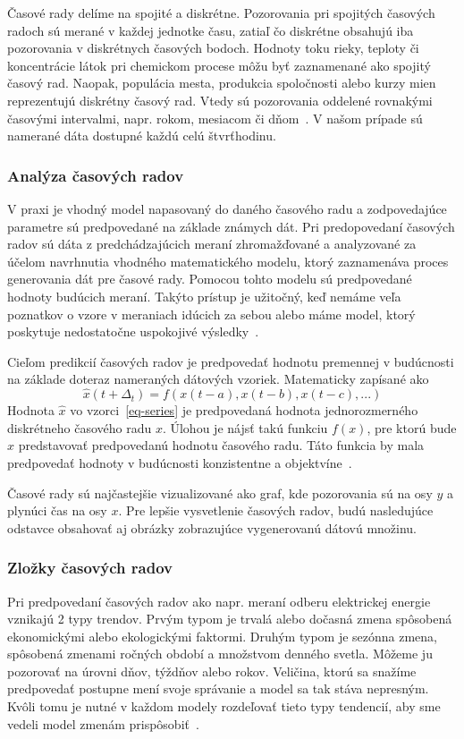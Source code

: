 \documentclass[a4paper,slovak,12pt,appendix]{article}
\begin{document}
Časové rady delíme na spojité a diskrétne. Pozorovania pri spojitých časových
radoch sú merané v každej jednotke času, zatiaľ čo diskrétne obsahujú iba
pozorovania v diskrétnych časových bodoch. Hodnoty toku rieky, teploty
či koncentrácie látok pri chemickom procese môžu byť zaznamenané ako spojitý
časový rad. Naopak, populácia mesta, produkcia spoločnosti alebo kurzy mien
reprezentujú diskrétny časový rad. Vtedy sú pozorovania oddelené rovnakými
časovými intervalmi, napr. rokom, mesiacom či dňom~\cite{Agrawal2013}. V našom
prípade sú namerané dáta dostupné každú celú štvrťhodinu.

\subsubsection{Analýza časových radov}
\label{time-series-analysis}
V praxi je vhodný model napasovaný do daného časového radu a zodpovedajúce
parametre sú predpovedané na základe známych dát. Pri predopovedaní časových
radov sú dáta z predchádzajúcich meraní zhromažďované a analyzované za účelom
navrhnutia vhodného matematického modelu, ktorý zaznamenáva proces generovania
dát pre časové rady. Pomocou tohto modelu sú predpovedané hodnoty budúcich
meraní. Takýto prístup je užitočný, keď nemáme veľa poznatkov o vzore
v meraniach idúcich za sebou alebo máme model, ktorý poskytuje nedostatočne
uspokojivé výsledky~\cite{Agrawal2013}.

Cieľom predikcií časových radov je predpovedať hodnotu premennej v budúcnosti
na základe doteraz nameraných dátových vzoriek. Matematicky zapísané ako
\begin{equation}
  \hat{x}(t+\Delta_t) = f(x(t-a), x(t-b), x(t-c), ...)
  \label{eq-series}
\end{equation}
Hodnota $\hat{x}$ vo vzorci~\ref{eq-series} je predpovedaná hodnota
jednorozmerného diskrétneho časového radu $x$. Úlohou je nájsť takú funkciu
$f(x)$, pre ktorú bude $\hat{x}$ predstavovať predpovedanú hodnotu časového
radu. Táto funkcia by mala predpovedať hodnoty v budúcnosti konzistentne
a objektvíne~\cite{Sapankevych2009}.

Časové rady sú najčastejšie vizualizované ako graf, kde pozorovania sú na
osy $y$ a plynúci čas na osy $x$. Pre lepšie vysvetlenie časových radov, budú
nasledujúce odstavce obsahovať aj obrázky zobrazujúce vygenerovanú dátovú
množinu.

\subsubsection{Zložky časových radov}
Pri predpovedaní časových radov ako napr. meraní odberu elektrickej energie
vznikajú 2 typy trendov. Prvým typom je trvalá alebo dočasná zmena spôsobená
ekonomickými alebo ekologickými faktormi. Druhým typom je sezónna zmena,
spôsobená zmenami ročných období a množstvom denného svetla. Môžeme ju pozorovať
na úrovni dňov, týždňov alebo rokov. Veličina, ktorú sa snažíme predpovedať
postupne mení svoje správanie a model sa tak stáva nepresným. Kvôli tomu je
nutné v každom modely rozdeľovať tieto typy tendencií, aby sme vedeli model
zmenám prispôsobiť~\cite{Grmanova2016}.
\end{document}
